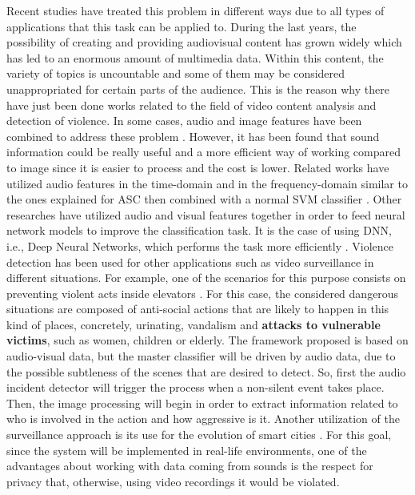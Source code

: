 Recent studies have treated this problem in different ways due to all types of applications that this task can be applied to. During the last years, the possibility of creating and providing audiovisual content has grown widely which has led to an enormous amount of multimedia data. Within this content, the variety of topics is uncountable and some of them may be considered unappropriated for certain parts of the audience. This is the reason why there have just been done works related to the field of video content analysis and detection of violence. In some cases, audio and image features have been combined to address these problem \cite{Giannakopoulos2010}. However, it has been found that sound information could be really useful and a more efficient way of working compared to image since it is easier to process and the cost is lower. Related works have utilized audio features in the time-domain and in the frequency-domain similar to the ones explained for ASC then combined with a normal SVM classifier \cite{Giannakopoulos2006}. Other researches have utilized audio and visual features together in order to feed neural network models to improve the classification task. It is the case of using DNN, i.e., Deep Neural Networks, which performs the task more efficiently \cite{Ali2018}. Violence detection has been used for other applications such as video surveillance in different situations. For example, one of the scenarios for this purpose consists on preventing violent acts inside elevators \cite{Chua2014}. For this case, the considered dangerous situations are composed of anti-social actions that are likely to happen in this kind of places, concretely, urinating, vandalism and {\textbf{\color{red}attacks to vulnerable victims}}, such as women, children or elderly. The framework proposed is based on audio-visual data, but the master classifier will be driven by audio data, due to the possible subtleness of the scenes that are desired to detect. So, first the audio incident detector will trigger the process when a non-silent event takes place. Then, the image processing will begin in order to extract information related to who is involved in the action and how aggressive is it. Another utilization of the surveillance approach is its use for the evolution of smart cities \cite{Garcia-Gomez2016}. For this goal, since the system will be implemented in real-life environments, one of the advantages about working with data coming from sounds is the respect for privacy that, otherwise, using video recordings it would be violated.

